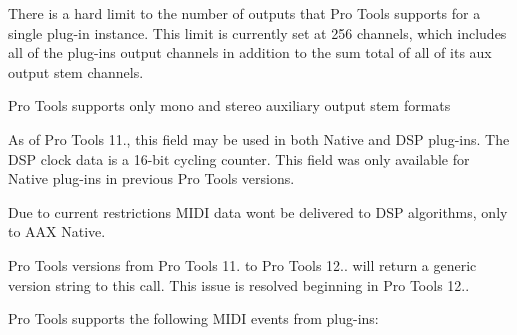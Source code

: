 \begin{DoxyRefList}
\item[\label{a00381__compatibility_notes000052}%
\hypertarget{a00381__compatibility_notes000052}{}%
Member \hyperlink{a00088_a76266e8a07ce20cdbe5721172c32a93d}{A\+A\+X\+\_\+\+I\+Component\+Descriptor\+:\+:Add\+Aux\+Output\+Stem} (A\+A\+X\+\_\+\+C\+Field\+Index in\+Field\+Index, int32\+\_\+t in\+Stem\+Format, const char in\+Name\+U\+T\+F8\mbox{[}\mbox{]})=0]There is a hard limit to the number of outputs that Pro Tools supports for a single plug-\/in instance. This limit is currently set at 256 channels, which includes all of the plug-\/in\textquotesingle{}s output channels in addition to the sum total of all of its aux output stem channels.

Pro Tools supports only mono and stereo auxiliary output stem formats 
\item[\label{a00381__compatibility_notes000051}%
\hypertarget{a00381__compatibility_notes000051}{}%
Member \hyperlink{a00088_a59727dee1043fcd7f14da130ab254445}{A\+A\+X\+\_\+\+I\+Component\+Descriptor\+:\+:Add\+Clock} (A\+A\+X\+\_\+\+C\+Field\+Index in\+Field\+Index)=0]As of Pro Tools 11., this field may be used in both Native and D\+S\+P plug-\/ins. The D\+S\+P clock data is a 16-\/bit cycling counter. This field was only available for Native plug-\/ins in previous Pro Tools versions. 
\item[\label{a00381__compatibility_notes000054}%
\hypertarget{a00381__compatibility_notes000054}{}%
Member \hyperlink{a00088_a6284dda9ccca898e33075de29dad4e39}{A\+A\+X\+\_\+\+I\+Component\+Descriptor\+:\+:Add\+M\+I\+D\+I\+Node} (A\+A\+X\+\_\+\+C\+Field\+Index in\+Field\+Index, A\+A\+X\+\_\+\+E\+M\+I\+D\+I\+Node\+Type in\+Node\+Type, const char in\+Node\+Name\mbox{[}\mbox{]}, uint32\+\_\+t channel\+Mask)=0]Due to current restrictions M\+I\+D\+I data won\textquotesingle{}t be delivered to D\+S\+P algorithms, only to A\+A\+X Native. 
\item[\label{a00381__compatibility_notes000055}%
\hypertarget{a00381__compatibility_notes000055}{}%
Member \hyperlink{a00090_ad2a002a133491b2ed572054588641e78}{A\+A\+X\+\_\+\+I\+Controller\+:\+:Get\+Host\+Name} (\hyperlink{a00113}{A\+A\+X\+\_\+\+I\+String} $\ast$out\+Host\+Name\+String) const =0]Pro Tools versions from Pro Tools 11. to Pro Tools 12.. will return a generic version string to this call. This issue is resolved beginning in Pro Tools 12.. 
\item[\label{a00381__compatibility_notes000056}%
\hypertarget{a00381__compatibility_notes000056}{}%
Member \hyperlink{a00105_a5e1c5409158164f57376f908c9693a8b}{A\+A\+X\+\_\+\+I\+M\+I\+D\+I\+Node\+:\+:Post\+M\+I\+D\+I\+Packet} (\hyperlink{a00024}{A\+A\+X\+\_\+\+C\+Midi\+Packet} $\ast$packet)=0]Pro Tools supports the following M\+I\+D\+I events from plug-\/ins\+:

\end{DoxyRefList}
